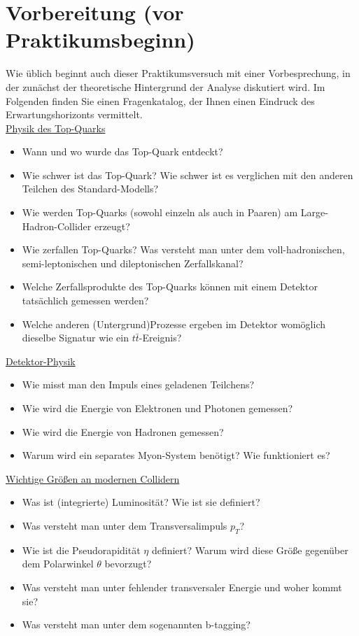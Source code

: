 \section{Vorbereitung (vor Praktikumsbeginn)}
\label{tasks}
Wie \"ublich beginnt auch dieser Praktikumsversuch mit einer Vorbesprechung, in der zun\"achst der theoretische Hintergrund der Analyse diskutiert wird. Im Folgenden finden Sie einen Fragenkatalog, der Ihnen einen Eindruck des Erwartungshorizonts vermittelt.\\
\underline{Physik des Top-Quarks}
\begin{itemize}
	\item Wann und wo wurde das Top-Quark entdeckt?
	\item Wie schwer ist das Top-Quark? Wie schwer ist es verglichen mit den anderen Teilchen des Standard-Modells?
	\item Wie werden Top-Quarks (sowohl einzeln als auch in Paaren) am Large-Hadron-Collider erzeugt?
	\item Wie zerfallen Top-Quarks? Was versteht man unter dem voll-hadronischen, semi-leptonischen und dileptonischen Zerfallskanal?
	\item Welche Zerfallsprodukte des Top-Quarks k\"onnen mit einem Detektor tats\"achlich gemessen werden?
	\item Welche anderen (Untergrund)Prozesse ergeben im Detektor wom\"oglich dieselbe Signatur wie ein $t\bar{t}$-Ereignis?
\end{itemize}
\underline{Detektor-Physik}
\begin{itemize}
	\item Wie misst man den Impuls eines geladenen Teilchens?
	\item Wie wird die Energie von Elektronen und Photonen gemessen?
	\item Wie wird die Energie von Hadronen gemessen?
	\item Warum wird ein separates Myon-System ben\"otigt? Wie funktioniert es?
\end{itemize}
\underline{Wichtige Gr\"o\ss{}en an modernen Collidern}
\begin{itemize}
	\item Was ist (integrierte) Luminosit\"at? Wie ist sie definiert?
	\item Was versteht man unter dem Transversalimpuls $p_{T}$?
	\item Wie ist die Pseudorapidit\"at $\eta$ definiert? Warum wird diese Gr\"o\ss{}e gegen\"uber dem Polarwinkel $\theta$ bevorzugt?
	\item Was versteht man unter fehlender transversaler Energie und woher kommt sie?
	\item Was versteht man unter dem sogenannten b-tagging?
\end{itemize}


